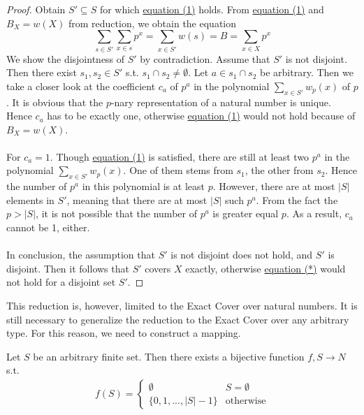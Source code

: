 \begin{proof}
    \label{lemma:sscompl}
Obtain $S' \subseteq S$ for which \hyperref[eq:1]{equation (1)} holds. 
From \hyperref[eq:1]{equation (1)} and  $B_X = w(X)$ from reduction, we obtain the equation 
\begin{equation}
    \sum_{s \in S'} \sum_{x \in s} p^x = \sum_{x \in S'} w(s) = B =  \sum_{x \in X} p^x \tag{*} \label{eq:proof}
\end{equation}
We show the disjointness of $S'$ by contradiction. 
Assume that $S'$ is not disjoint. Then there exist $s_1, s_2 \in S'$ s.t. $s_1 \cap s_2 \not= \emptyset$. Let $a \in s_1 \cap s_2$ be arbitrary. 
Then we take a closer look at the coefficient $c_a$ of $p^a$ in the polynomial $\sum_{x \in S'} w_p(x)$ of $p$. 
It is obvious that the $p$-nary representation of a natural number is unique. 
Hence $c_a$ has to be exactly one, otherwise \hyperref[eq:1]{equation (1)} would not hold because of $B_X = w(X)$. \\\\ 
For $c_a = 1$. Though \hyperref[eq:1]{equation (1)} is satisfied, there are still at least two $p^a$ in the polynomial $\sum_{x \in S'} w_p(x)$.
One of them stems from $s_1$, the other from $s_2$.
Hence the number of $p^a$ in this polynomial is at least $p$. However, there are at most $|S|$ elements in $S'$, meaning that there are at most $|S|$ such $p^a$. From the 
fact the $p > |S|$, it is not possible that the number of $p^a$ is greater equal $p$. As a result, $c_a$ cannot be 1, either. \\\\
In conclusion, the assumption that $S'$ is not disjoint does not hold, and $S'$ is disjoint. 
Then it follows that $S'$ covers $X$ exactly, otherwise \hyperref[eq:proof]{equation (*)} would not hold for a disjoint set $S'$.

\end{proof}
This reduction is, however, limited to the Exact Cover over natural numbers. It is still necessary to generalize the reduction to the Exact Cover over any arbitrary type. 
For this reason, we need to construct a mapping.
\begin{lemma}
    \label{lemma:9}
    Let $S$ be an arbitrary finite set. Then there exists a bijective function $f, S \rightarrow N$ s.t. 
    \begin{align*}
        f(S) = \begin{cases}
            \emptyset & S = \emptyset \\ 
            \{0, 1, ..., |S| - 1\} & \text{otherwise}
        \end{cases}
    \end{align*}
\end{lemma}
